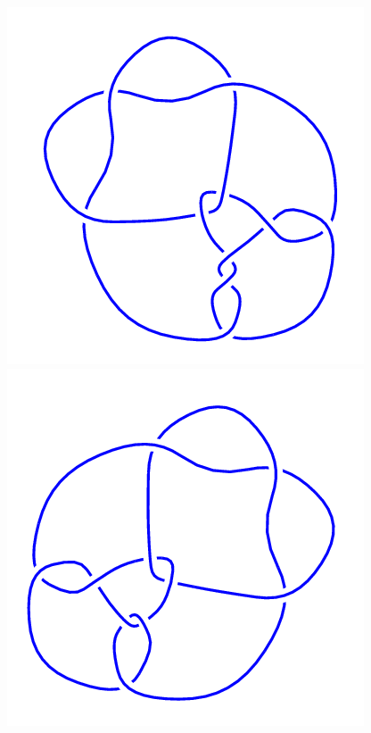 \begin{figure}[H]
\begin{minipage}[b]{.18\linewidth}
    \end{minipage}
    \begin{minipage}[b]{.18\linewidth}
        \centering
        \includegraphics[width=\linewidth]{../data/10_79.png}
    \end{minipage}
    \begin{minipage}[b]{.18\linewidth}
        \centering
        \includegraphics[width=\linewidth]{../data/10_80.png}

\end{minipage}
\end{figure}
